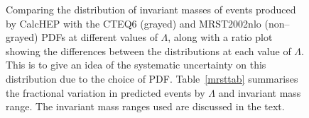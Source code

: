 \begin{figure}[htp]
\begin{minipage}[b]{.69\textwidth}
\begin{infilsf}\tiny

\end{infilsf}
\end{minipage}
\begin{minipage}[b]{.3\textwidth}
\caption{Comparing the distribution of invariant masses of events produced by CalcHEP with the CTEQ6 (grayed) and MRST2002nlo (non--grayed) PDFs at different values of $\Lambda$, along with a ratio plot showing the differences between the distributions at each value of $\Lambda$. This is to give an idea of the systematic uncertainty on this distribution due to the choice of PDF. Table~\ref{mrsttab} summarises the fractional variation in predicted events by $\Lambda$ and invariant mass range. The invariant mass ranges used are discussed in the text. \label{mrst}}
\end{minipage}
\end{figure}
